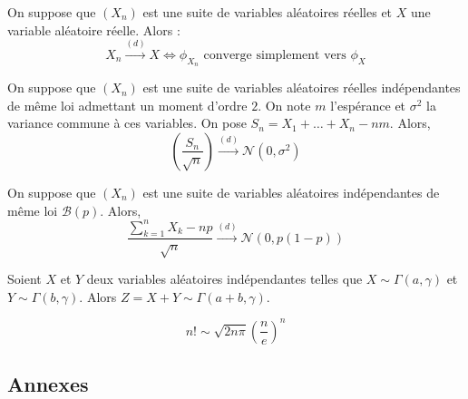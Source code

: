 
	\begin{theorem}[Lévy]
		On suppose que $(X_n)$ est une suite de variables aléatoires réelles et $X$ une variable aléatoire réelle. Alors :
		\[ X_n \overset{(d)}{\longrightarrow} X \iff \phi_{X_n} \text{ converge simplement vers } \phi_X \]
	\end{theorem}


	\begin{theorem}
		On suppose que $(X_n)$ est une suite de variables aléatoires réelles indépendantes de même loi admettant un moment d'ordre $2$. On note $m$ l'espérance et $\sigma^2$ la variance commune à ces variables. On pose $S_n = X_1 + \dots + X_n - nm$. Alors,
		\[ \left ( \frac{S_n}{\sqrt{n}} \right) \overset{(d)}{\longrightarrow} \mathcal{N}(0, \sigma^2) \]
	\end{theorem}

	\begin{application}
		On suppose que $(X_n)$ est une suite de variables aléatoires indépendantes de même loi $\mathcal{B}(p)$. Alors,
		\[ \frac{\sum_{k=1}^{n} X_k - np}{\sqrt{n}} \overset{(d)}{\longrightarrow} \mathcal{N}(0, p(1-p)) \]
	\end{application}


	\begin{lemma}
		Soient $X$ et $Y$ deux variables aléatoires indépendantes telles que $X \sim \Gamma(a, \gamma)$ et $Y \sim \Gamma(b, \gamma)$. Alors $Z = X + Y \sim \Gamma(a+b, \gamma)$.
	\end{lemma}


	\begin{application}
		\[ n! \sim \sqrt{2n\pi} \left(\frac{n}{e} \right)^n \]
	\end{application}

	\subsection*{Annexes}

